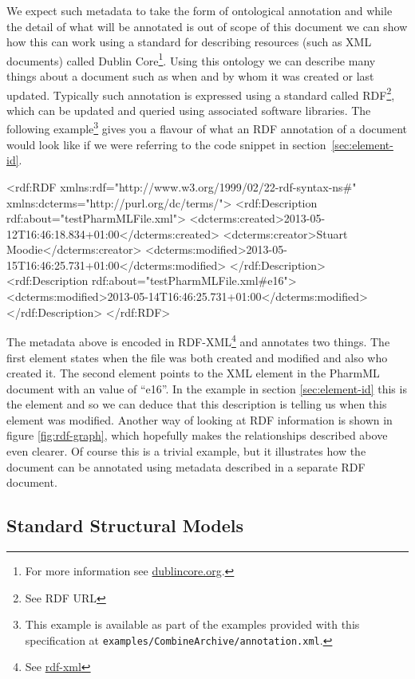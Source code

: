 We expect such metadata to take the form of ontological annotation and
while the detail of what will be annotated is out of scope of this
document we can show how this can work using a standard for describing
resources (such as XML documents) called Dublin Core\footnote{For more
  information see \url{dublincore.org}.}. Using this ontology we can
describe many things about a \pharmml document such as when and by
whom it was created or last updated. Typically such annotation is
expressed using a standard called RDF\footnote{See RDF URL}, which can
be updated and queried using associated software libraries. The
following example\footnote{This example is available as part of the
  examples provided with this specification at
  \texttt{examples/\-CombineArchive/\-annotation.xml}.} gives you a
flavour of what an RDF annotation of a \pharmml document would look
like if we were referring to the code snippet in
section~\ref{sec:element-id}.
%
\begin{xmlcode}
<rdf:RDF
    xmlns:rdf="http://www.w3.org/1999/02/22-rdf-syntax-ns#"
    xmlns:dcterms="http://purl.org/dc/terms/">
  <rdf:Description rdf:about="testPharmMLFile.xml">
    <dcterms:created>2013-05-12T16:46:18.834+01:00</dcterms:created>
    <dcterms:creator>Stuart Moodie</dcterms:creator>
    <dcterms:modified>2013-05-15T16:46:25.731+01:00</dcterms:modified>
  </rdf:Description>
  <rdf:Description rdf:about="testPharmMLFile.xml#e16">
    <dcterms:modified>2013-05-14T16:46:25.731+01:00</dcterms:modified>
  </rdf:Description>
</rdf:RDF>
\end{xmlcode}
%
The metadata above is encoded in RDF-XML\footnote{See \url{rdf-xml}}
and annotates two things. The first 
element states when the file was both created and modified and also
who created it. The second  element points to
the XML element in the PharmML document with an  value of
``e16''. In the example in section \ref{sec:element-id} this is the
 element and so we can deduce that this
description is telling us when this element was modified.
Another way of looking at RDF information is shown in figure
\ref{fig:rdf-graph}, which hopefully makes the relationships described
above even clearer. Of course this is a trivial example, but it
illustrates how the \pharmml document can be annotated using metadata
described in a separate RDF document.


\subsection{Standard Structural Models}

